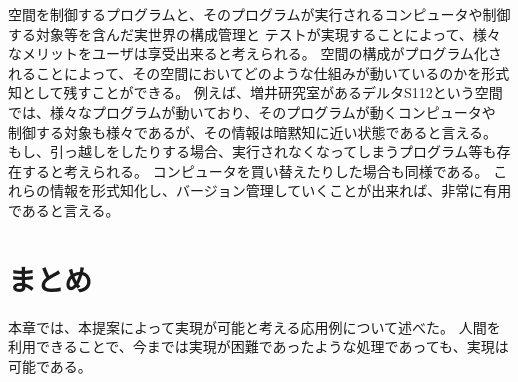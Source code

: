 空間を制御するプログラムと、そのプログラムが実行されるコンピュータや制御する対象等を含んだ実世界の構成管理と
テストが実現することによって、様々なメリットをユーザは享受出来ると考えられる。
空間の構成がプログラム化されることによって、その空間においてどのような仕組みが動いているのかを形式知として残すことができる。
例えば、増井研究室があるデルタS112という空間では、様々なプログラムが動いており、そのプログラムが動くコンピュータや
制御する対象も様々であるが、その情報は暗黙知に近い状態であると言える。
もし、引っ越しをしたりする場合、実行されなくなってしまうプログラム等も存在すると考えられる。
コンピュータを買い替えたりした場合も同様である。
これらの情報を形式知化し、バージョン管理していくことが出来れば、非常に有用であると言える。

\section{まとめ}\label{ux307eux3068ux3081}

本章では、本提案によって実現が可能と考える応用例について述べた。
人間を利用できることで、今までは実現が困難であったような処理であっても、実現は可能である。
